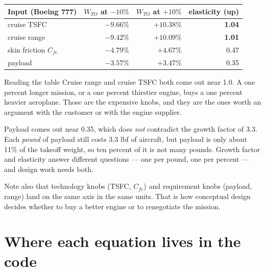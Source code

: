 \documentclass[11pt, a4paper]{article}
\begin{document}
\begin{center}
\footnotesize
\begin{tabular}{@{}lrrr@{}}
\toprule
Input (Boeing 777) & $W_{TO}$ at $-10\%$ & $W_{TO}$ at $+10\%$ & elasticity (up) \\
\midrule
cruise TSFC            & $-9.66\%$ & $+10.38\%$ & \textbf{1.04} \\
cruise range           & $-9.42\%$ & $+10.09\%$ & \textbf{1.01} \\
skin friction $C_{fe}$ & $-4.79\%$ & $+4.67\%$  & 0.47 \\
payload                & $-3.57\%$ & $+3.47\%$  & 0.35 \\
\bottomrule
\end{tabular}
\end{center}

\begin{keybox}{Reading the table}
Cruise range and cruise TSFC both come out near 1.0. A one percent longer
mission, or a one percent thirstier engine, buys a one percent heavier
aeroplane. Those are the expensive knobs, and they are the ones worth an
argument with the customer or with the engine supplier.

Payload comes out near 0.35, which does \emph{not} contradict the growth factor
of 3.3. Each \emph{pound} of payload still costs 3.3 lbf of aircraft, but
payload is only about 11\% of the takeoff weight, so ten percent of it is not
many pounds. Growth factor and elasticity answer different questions --- one per
pound, one per percent --- and design work needs both.

Note also that technology knobs (TSFC, $C_{fe}$) and requirement knobs (payload,
range) land on the same axis in the same units. That is how conceptual design
decides whether to buy a better engine or to renegotiate the mission.
\end{keybox}

\section{Where each equation lives in the code}
\end{document}
